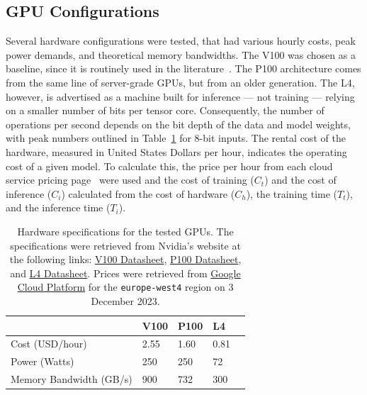 \documentclass[sn-mathphys-num]{sn-jnl}%
\begin{document}
\subsection{GPU Configurations}

Several hardware configurations were tested, that had various hourly costs, peak power demands, and theoretical memory bandwidths. The V100 was chosen as a baseline, since it is routinely used in the literature~\cite{svedin2021benchmarking,xu2018deep}. The P100 architecture comes from the same line of server-grade GPUs, but from an older generation. The L4, however, is advertised as a machine built for inference --- not training --- relying on a smaller number of bits per tensor core. Consequently, the number of operations per second depends on the bit depth of the data and model weights, with peak numbers outlined in Table~\ref{tab:hardware} for 8-bit inputs. The rental cost of the hardware, measured in United States Dollars per hour, indicates the operating cost of a given model. To calculate this, the price per hour from each cloud service pricing page~\cite{pricing_1,pricing_2} were used and the cost of training ($C_{t}$) and the cost of inference ($C_{i}$) calculated from the cost of hardware ($C_{h}$), the training time ($T_{t}$), and the inference time ($T_{i}$).
\begin{table}[h]
    \centering
    \begin{tabular}{lllll}
    \toprule
                            & V100   & P100   & L4    &  \\
    \midrule
    Cost (USD/hour)         & 2.55   & 1.60   & 0.81   &  \\
    Power (Watts)           & 250    & 250    & 72    &  \\
    Memory Bandwidth (GB/s) & 900    & 732    & 300   &  \\
    \bottomrule
    \end{tabular}
    \caption{Hardware specifications for the tested GPUs. The specifications were retrieved from Nvidia's website at the following links:
    \href{https://images.nvidia.com/content/technologies/volta/pdf/volta-v100-datasheet-update-us-1165301-r5.pdf}{V100 Datasheet},
    \href{https://images.nvidia.com/content/tesla/pdf/nvidia-tesla-p100-PCIe-datasheet.pdf}{P100 Datasheet}, and
    \href{https://nvdam.widen.net/s/rvq98gbwsw/l4-datasheet-2595652}{L4 Datasheet}. Prices were retrieved from \href{https://cloud.google.com/pricing/list}{Google Cloud Platform} for the \texttt{europe-west4} region on 3 December 2023.
    }
    \label{tab:hardware}
\end{table}
\end{document}

